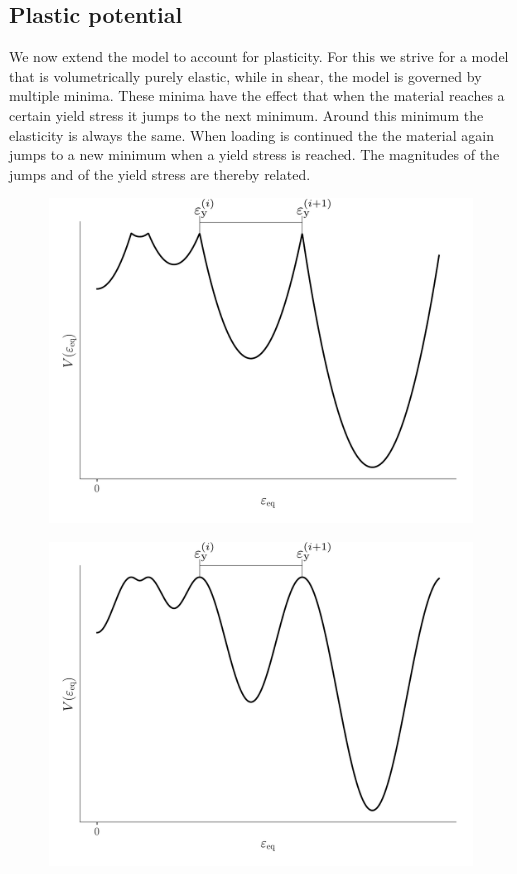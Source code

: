 \documentclass[times,namecite]{goose-article}
\begin{document}
\subsection{Plastic potential}

We now extend the model to account for plasticity. For this we strive for a model that is volumetrically purely elastic, while in shear, the model is governed by multiple minima. These minima have the effect that when the material reaches a certain yield stress it jumps to the next minimum. Around this minimum the elasticity is always the same. When loading is continued the the material again jumps to a new minimum when a yield stress is reached. The magnitudes of the jumps and of the yield stress are thereby related.

\begin{figure}[htp]
  \centering
  \captionsetup[subfigure]{justification=centering}
  \begin{minipage}[t]{.49\textwidth}
    \centering
    \includegraphics[width=1.\textwidth]{potential_V-plas}
    \label{fig:V-plas}
  \end{minipage}
  \hfill
  \begin{minipage}[t]{.49\textwidth}
    \centering
    \includegraphics[width=1.\textwidth]{potential_V-plas-smooth}

\end{minipage}
\end{figure}
\end{document}
